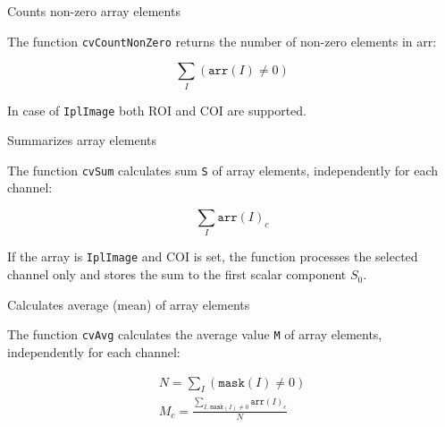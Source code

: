 
Counts non-zero array elements


\begin{description}
\end{description}


The function \texttt{cvCountNonZero} returns the number of non-zero elements in arr:

\[ \sum_I (\texttt{arr}(I) \ne 0) \]

In case of \texttt{IplImage} both ROI and COI are supported.



Summarizes array elements


\begin{description}
\end{description}


The function \texttt{cvSum} calculates sum \texttt{S} of array elements, independently for each channel:

\[ \sum_I \texttt{arr}(I)_c \]

If the array is \texttt{IplImage} and COI is set, the function processes the selected channel only and stores the sum to the first scalar component $S_0$.


Calculates average (mean) of array elements


\begin{description}
\end{description}


The function \texttt{cvAvg} calculates the average value \texttt{M} of array elements, independently for each channel:

\[
\begin{array}{l}
N = \sum_I (\texttt{mask}(I) \ne 0)\\
M_c = \frac{\sum_{ I, \, \texttt{mask}(I) \ne 0} \texttt{arr}(I)_c}{N}
\end{array}
\]

